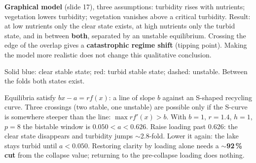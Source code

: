 \textbf{Graphical model} (slide 17), three assumptions: turbidity rises with nutrients; vegetation lowers turbidity;
vegetation vanishes above a critical turbidity. Result: at low nutrients only the clear state exists, at high nutrients
only the turbid state, and in between \textbf{both}, separated by an unstable equilibrium. Crossing the edge of the
overlap gives a \textbf{catastrophic regime shift} (tipping point). Making the model more realistic does not change
this qualitative conclusion.

\begin{center}

\small Solid blue: clear stable state; red: turbid stable state; dashed: unstable. Between the folds both states exist.
\end{center}

\begin{chain}
Equilibria satisfy $bx-a=rf(x)$: a line of slope $b$ against an S-shaped recycling curve. Three crossings (two stable,
one unstable) are possible only if the S-curve is somewhere steeper than the line: $\max rf'(x)>b$. With $b=1$, $r=1.4$,
$h=1$, $p=8$ the bistable window is $0.050<a<0.626$. Raise loading past 0.626: the clear state disappears and turbidity
jumps $\sim$2.8-fold. Lower it again: the lake stays turbid until $a<0.050$. Restoring clarity by loading alone needs a
\textbf{$\sim$92\,\% cut} from the collapse value; returning to the pre-collapse loading does nothing.
\end{chain}

